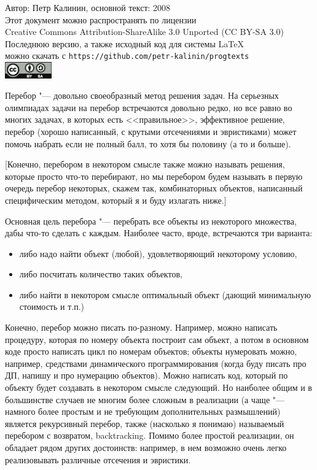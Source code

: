 \documentclass[a4paper,10pt]{problems}
\begin{document}

\begin{flushright}
Автор: Петр Калинин, основной текст: 2008\\
Этот документ можно распространять по лицензии\\
Creative Commons Attribution-ShareAlike 3.0 Unported (CC BY-SA 3.0)\\
Последнюю версию, а также исходный код для системы \LaTeX\\
можно скачать с \verb`https://github.com/petr-kalinin/progtexts`\\
\includegraphics[width=2cm]{by-sa-corr.eps}
\end{flushright}

Перебор "--- довольно своеобразный метод решения задач. На серьезных олимпиадах 
задачи на перебор встречаются довольно редко, но все равно во многих задачах, в 
которых есть <<правильное>>, эффективное решение, перебор (хорошо написанный, с 
крутыми отсечениями и эвристиками) может помочь набрать если не полный балл, то 
хотя бы половину (а то и больше).

[Конечно, перебором в некотором смысле также можно называть решения, которые 
просто что-то перебирают, но мы перебором будем называть в первую очередь перебор 
некоторых, скажем так, комбинаторных объектов, написанный специфическим методом, который я и буду
излагать ниже.]

Основная цель перебора "--- перебрать все объекты из некоторого множества, дабы 
что-то сделать с каждым. Наиболее 
часто, вроде, встречаются три варианта:
\begin{itemize}
\item либо надо найти объект (любой), удовлетворяющий некоторому условию,
\item либо посчитать количество таких объектов,
\item либо найти в некотором смысле оптимальный объект (дающий минимальную 
   стоимость и т.п.)
\end{itemize}

Конечно, перебор можно писать по-разному. Например, можно написать процедуру, которая по номеру объекта построит сам объект, а потом в основном коде просто написать цикл по номерам объектов; объекты нумеровать можно, например, средствами динамического программирования (когда буду писать про ДП, напишу и про нумерацию объектов). Можно написать код, который по 
объекту будет создавать в некотором смысле следующий. Но наиболее
общим и в большинстве случаев не многим более сложным в реализации (а чаще "--- намного более простым и не требующим дополнительных размышлений) является
рекурсивный перебор, также (насколько я понимаю) называемый перебором с
возвратом, backtracking. Помимо более простой реализации, он обладает рядом других достоинств: например, в нем возможно очень легко реализовывать различные отсечения и эвристики.
\end{document}
